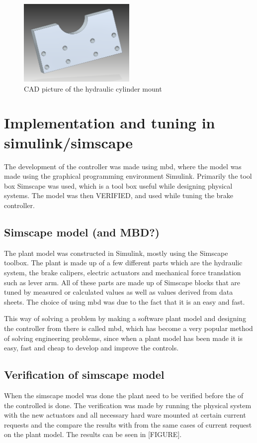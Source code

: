 \documentclass[a4paper,11pt]{kth-mag}
\begin{document}
\begin{figure}[h]
\centering
\includegraphics[width=0.5\textwidth]{Hydraulic_cylinder_mount}
\caption{CAD picture of the hydraulic cylinder mount}
\label{fig:CAD_Hydraulic_cylinder_mount}
\end{figure}



\section{Implementation and tuning in simulink/simscape}

The development of the controller was made using \gls{mbd}, where the model was made using the graphical programming environment Simulink. Primarily the tool box Simscape was used, which is a tool box useful while designing physical systems. The model was then VERIFIED, and used while tuning the brake controller. 

\subsection{Simscape model (and MBD?)}
The plant model was constructed in Simulink, mostly using the Simscape toolbox. The plant is made up of a few different parts which are the hydraulic system, the brake calipers, electric actuators and mechanical force translation such as lever arm. All of these parts are made up of Simscape blocks that are tuned by measured or calculated values  as well as values derived from data sheets. The choice of using \gls{mbd} was due to the fact that it is an easy and fast. 

This way of solving a problem by making a software plant model and designing the controller from there is called \gls{mbd}, which has become a very popular method of solving engineering problems, since when a plant model has been made it is easy, fast and cheap to develop and improve the controls\cite{2010-01-1999}. 

\subsection{Verification of simscape model}
When the simscape model was done the plant need to be verified before the of the controlled is done. The verification was made by running the physical system with the new actuators and all necessary hard ware mounted at certain current requests and the compare the results with from the same cases of current request on the plant model. The results can be seen in [FIGURE]. 
\end{document}
